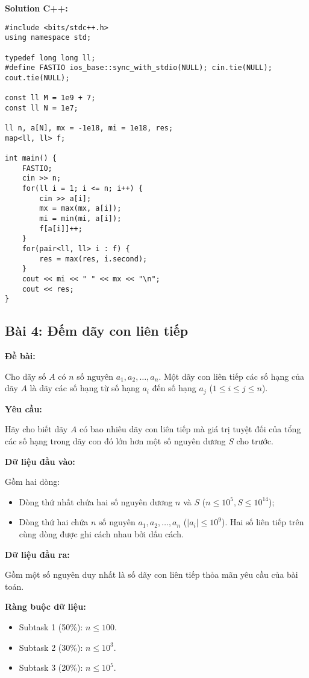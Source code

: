 \documentclass[12pt]{scrartcl}  %
\begin{document}
\textbf{Solution C++:}
\begin{lstlisting}
#include <bits/stdc++.h>
using namespace std;

typedef long long ll;
#define FASTIO ios_base::sync_with_stdio(NULL); cin.tie(NULL); cout.tie(NULL);

const ll M = 1e9 + 7;
const ll N = 1e7;

ll n, a[N], mx = -1e18, mi = 1e18, res;
map<ll, ll> f;

int main() {
    FASTIO;
    cin >> n;
    for(ll i = 1; i <= n; i++) {
        cin >> a[i];
        mx = max(mx, a[i]);
        mi = min(mi, a[i]);
        f[a[i]]++;
    }
    for(pair<ll, ll> i : f) {
        res = max(res, i.second);
    }
    cout << mi << " " << mx << "\n";
    cout << res;
}

\end{lstlisting}

\subsection{Bài 4: Đếm dãy con liên tiếp}
\textbf{Đề bài:}

Cho dãy số $A$ có $n$ số nguyên $a_1, a_2, \ldots, a_n$. Một dãy con liên tiếp các số hạng của dãy $A$ là dãy các số hạng từ số hạng $a_i$ đến số hạng $a_j$ ($1 \leq i \leq j \leq n$).

\textbf{Yêu cầu:}

Hãy cho biết dãy $A$ có bao nhiêu dãy con liên tiếp mà giá trị tuyệt đối của tổng các số hạng trong dãy con đó lớn hơn một số nguyên dương $S$ cho trước.

\textbf{Dữ liệu đầu vào:}

Gồm hai dòng:
\begin{itemize}
    \item Dòng thứ nhất chứa hai số nguyên dương $n$ và $S$ ($n \leq 10^5, S \leq 10^{14}$);
    \item Dòng thứ hai chứa $n$ số nguyên $a_1, a_2, \ldots, a_n$ ($|a_i| \leq 10^9$). Hai số liên tiếp trên cùng dòng được ghi cách nhau bởi dấu cách.
\end{itemize}

\textbf{Dữ liệu đầu ra:}

Gồm một số nguyên duy nhất là số dãy con liên tiếp thỏa mãn yêu cầu của bài toán.

\textbf{Ràng buộc dữ liệu:}
\begin{itemize}
    \item Subtask 1 (50\%): $n \leq 100$.
    \item Subtask 2 (30\%): $n \leq 10^3$.
    \item Subtask 3 (20\%): $n \leq 10^5$.
\end{itemize}
\end{document}
